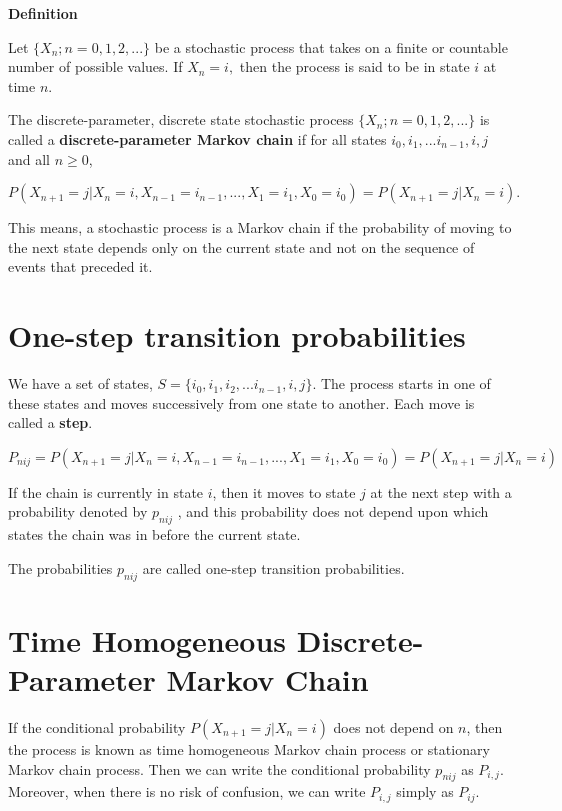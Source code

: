 \documentclass[
  letterpaper,
  DIV=11,
  numbers=noendperiod]{scrreprt}
\begin{document}
\textbf{Definition}

Let \(\{X_n; n = 0, 1, 2, ...\}\) be a stochastic process that takes on
a finite or countable number of possible values. If \(X_n=i,\) then the
process is said to be in state \(i\) at time \(n\).

The discrete-parameter, discrete state stochastic process
\(\{X_n; n=0, 1, 2,...\}\) is called a \textbf{discrete-parameter Markov
chain} if for all states \(i_0, i_1,...i_{n-1}, i, j\) and all
\(n \geq 0\),

\[P(X_{n+1}=j|X_n=i, X_{n-1}=i_{n-1}, ..., X_1=i_1, X_0=i_0) = P(X_{n+1}=j|X_n=i).\]

This means, a stochastic process is a Markov chain if the probability of
moving to the next state depends only on the current state and not on
the sequence of events that preceded it.

\section{One-step transition
probabilities}\label{one-step-transition-probabilities}

We have a set of states, \(S = \{i_0, i_1, i_2,...i_{n-1}, i, j\}\). The
process starts in one of these states and moves successively from one
state to another. Each move is called a \textbf{step}.

\(P_{nij} = P(X_{n+1}=j|X_n=i, X_{n-1}=i_{n-1}, ..., X_1=i_1, X_0=i_0) = P(X_{n+1}=j|X_n=i)\)

If the chain is currently in state \(i\), then it moves to state \(j\)
at the next step with a probability denoted by \(p_{nij}\) , and this
probability does not depend upon which states the chain was in before
the current state.

The probabilities \(p_{nij}\) are called one-step transition
probabilities.

\section{Time Homogeneous Discrete-Parameter Markov
Chain}\label{time-homogeneous-discrete-parameter-markov-chain}

If the conditional probability \(P(X_{n+1}=j|X_n=i)\) does not depend on
\(n\), then the process is known as time homogeneous Markov chain
process or stationary Markov chain process. Then we can write the
conditional probability \(p_{nij}\) as \(P_{i,j}\). Moreover, when there
is no risk of confusion, we can write \(P_{i,j}\) simply as \(P_{ij}\).
\end{document}
